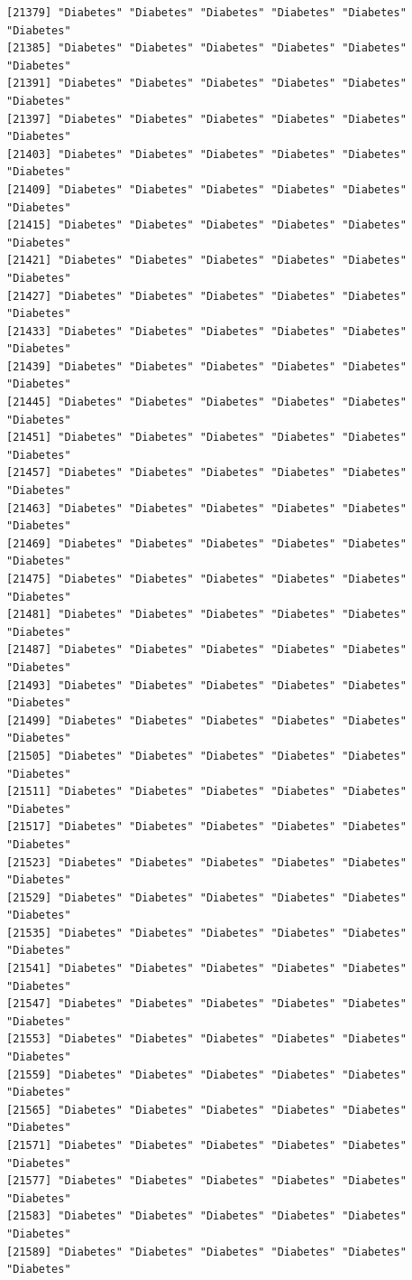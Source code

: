 \documentclass[
  letterpaper,
  DIV=11,
  numbers=noendperiod]{scrartcl}
\begin{document}
\begin{verbatim}
[21379] "Diabetes" "Diabetes" "Diabetes" "Diabetes" "Diabetes" "Diabetes"
[21385] "Diabetes" "Diabetes" "Diabetes" "Diabetes" "Diabetes" "Diabetes"
[21391] "Diabetes" "Diabetes" "Diabetes" "Diabetes" "Diabetes" "Diabetes"
[21397] "Diabetes" "Diabetes" "Diabetes" "Diabetes" "Diabetes" "Diabetes"
[21403] "Diabetes" "Diabetes" "Diabetes" "Diabetes" "Diabetes" "Diabetes"
[21409] "Diabetes" "Diabetes" "Diabetes" "Diabetes" "Diabetes" "Diabetes"
[21415] "Diabetes" "Diabetes" "Diabetes" "Diabetes" "Diabetes" "Diabetes"
[21421] "Diabetes" "Diabetes" "Diabetes" "Diabetes" "Diabetes" "Diabetes"
[21427] "Diabetes" "Diabetes" "Diabetes" "Diabetes" "Diabetes" "Diabetes"
[21433] "Diabetes" "Diabetes" "Diabetes" "Diabetes" "Diabetes" "Diabetes"
[21439] "Diabetes" "Diabetes" "Diabetes" "Diabetes" "Diabetes" "Diabetes"
[21445] "Diabetes" "Diabetes" "Diabetes" "Diabetes" "Diabetes" "Diabetes"
[21451] "Diabetes" "Diabetes" "Diabetes" "Diabetes" "Diabetes" "Diabetes"
[21457] "Diabetes" "Diabetes" "Diabetes" "Diabetes" "Diabetes" "Diabetes"
[21463] "Diabetes" "Diabetes" "Diabetes" "Diabetes" "Diabetes" "Diabetes"
[21469] "Diabetes" "Diabetes" "Diabetes" "Diabetes" "Diabetes" "Diabetes"
[21475] "Diabetes" "Diabetes" "Diabetes" "Diabetes" "Diabetes" "Diabetes"
[21481] "Diabetes" "Diabetes" "Diabetes" "Diabetes" "Diabetes" "Diabetes"
[21487] "Diabetes" "Diabetes" "Diabetes" "Diabetes" "Diabetes" "Diabetes"
[21493] "Diabetes" "Diabetes" "Diabetes" "Diabetes" "Diabetes" "Diabetes"
[21499] "Diabetes" "Diabetes" "Diabetes" "Diabetes" "Diabetes" "Diabetes"
[21505] "Diabetes" "Diabetes" "Diabetes" "Diabetes" "Diabetes" "Diabetes"
[21511] "Diabetes" "Diabetes" "Diabetes" "Diabetes" "Diabetes" "Diabetes"
[21517] "Diabetes" "Diabetes" "Diabetes" "Diabetes" "Diabetes" "Diabetes"
[21523] "Diabetes" "Diabetes" "Diabetes" "Diabetes" "Diabetes" "Diabetes"
[21529] "Diabetes" "Diabetes" "Diabetes" "Diabetes" "Diabetes" "Diabetes"
[21535] "Diabetes" "Diabetes" "Diabetes" "Diabetes" "Diabetes" "Diabetes"
[21541] "Diabetes" "Diabetes" "Diabetes" "Diabetes" "Diabetes" "Diabetes"
[21547] "Diabetes" "Diabetes" "Diabetes" "Diabetes" "Diabetes" "Diabetes"
[21553] "Diabetes" "Diabetes" "Diabetes" "Diabetes" "Diabetes" "Diabetes"
[21559] "Diabetes" "Diabetes" "Diabetes" "Diabetes" "Diabetes" "Diabetes"
[21565] "Diabetes" "Diabetes" "Diabetes" "Diabetes" "Diabetes" "Diabetes"
[21571] "Diabetes" "Diabetes" "Diabetes" "Diabetes" "Diabetes" "Diabetes"
[21577] "Diabetes" "Diabetes" "Diabetes" "Diabetes" "Diabetes" "Diabetes"
[21583] "Diabetes" "Diabetes" "Diabetes" "Diabetes" "Diabetes" "Diabetes"
[21589] "Diabetes" "Diabetes" "Diabetes" "Diabetes" "Diabetes" "Diabetes"

\end{verbatim}
\end{document}
